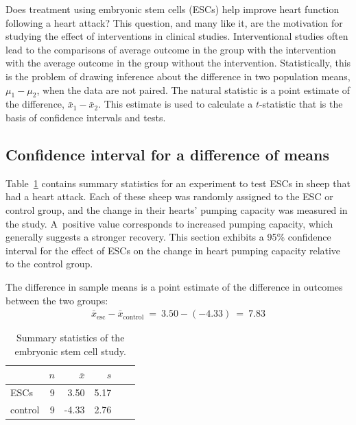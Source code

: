 Does treatment using embryonic stem cells (ESCs) help improve heart function following a heart attack?  This question, and many like it, are the motivation for studying the effect of interventions in clinical studies. Interventional studies often lead to the comparisons of average outcome in the group with the intervention with the average outcome in the group without the intervention.  Statistically, this is the problem of drawing inference about the difference in two population means, $\mu_1 - \mu_2$, when the data are not paired. The natural statistic is a point estimate of the difference, $\bar{x}_1 - \bar{x}_2$.  This estimate is used to calculate a $t$-statistic that is the basis of confidence intervals and tests.

\subsection{Confidence interval for a difference of means}
\label{confidenceIntervalDifferenceMeans}


Table~\ref{summaryStatsForSheepHeartDataWhoReceivedMiceESCs} contains summary statistics for an experiment to test ESCs in sheep that had a heart attack. Each of these sheep was randomly assigned to the ESC or control group, and the change in their hearts' pumping capacity was measured in the study. A~positive value corresponds to increased pumping capacity, which generally suggests a stronger recovery. This section exhibits a 95\% confidence interval for the effect of ESCs on the change in heart pumping capacity relative to the control group.

The difference in sample means is a point estimate of the difference in outcomes between the two groups:
\begin{eqnarray*}
\bar{x}_{\text{esc}} - \bar{x}_{\text{control}}\ =\ 3.50 - (-4.33)\ =\ 7.83
\end{eqnarray*}

\begin{table}[h]
\centering
\begin{tabular}{l rrrrr}
\hline
\hspace{10mm}	& $n$	& $\bar{x}$	& $s$  	 \\
\hline
ESCs		& 9		& 3.50		& 5.17  	\\
control		& 9		& -4.33		& 2.76  	 \\
\hline
\end{tabular}
\caption{Summary statistics of the embryonic stem cell study.}
\label{summaryStatsForSheepHeartDataWhoReceivedMiceESCs}
\end{table}

